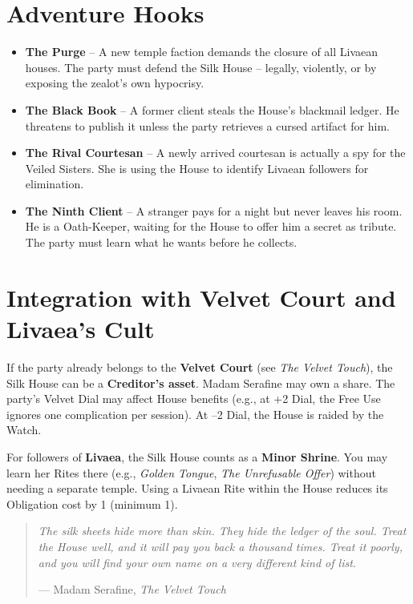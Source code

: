\documentclass[10pt,twoside]{book}
\begin{document}
\section{Adventure Hooks}

\begin{itemize}
  \item \textbf{The Purge} -- A new temple faction demands the closure of all Livaean houses. The party must defend the Silk House -- legally, violently, or by exposing the zealot's own hypocrisy.

  \item \textbf{The Black Book} -- A former client steals the House's blackmail ledger. He threatens to publish it unless the party retrieves a cursed artifact for him.

  \item \textbf{The Rival Courtesan} -- A newly arrived courtesan is actually a spy for the Veiled Sisters. She is using the House to identify Livaean followers for elimination.

  \item \textbf{The Ninth Client} -- A stranger pays for a night but never leaves his room. He is a Oath-Keeper, waiting for the House to offer him a secret as tribute. The party must learn what he wants before he collects.
\end{itemize}

\section{Integration with Velvet Court and Livaea's Cult}

If the party already belongs to the \textbf{Velvet Court} (see \textit{The Velvet Touch}), the Silk House can be a \textbf{Creditor's asset}. Madam Serafine may own a share. The party's Velvet Dial may affect House benefits (e.g., at +2 Dial, the Free Use ignores one complication per session). At --2 Dial, the House is raided by the Watch.

For followers of \textbf{Livaea}, the Silk House counts as a \textbf{Minor Shrine}. You may learn her Rites there (e.g., \textit{Golden Tongue}, \textit{The Unrefusable Offer}) without needing a separate temple. Using a Livaean Rite within the House reduces its Obligation cost by 1 (minimum 1).

\begin{quote}
\itshape
The silk sheets hide more than skin. They hide the ledger of the soul. Treat the House well, and it will pay you back a thousand times. Treat it poorly, and you will find your own name on a very different kind of list.

\vspace{0.2cm}
--- Madam Serafine, \textit{The Velvet Touch}
\end{quote}
\end{document}
